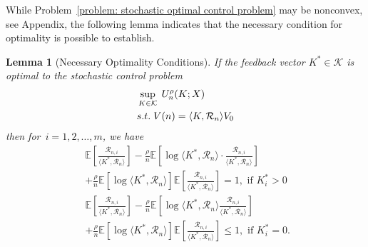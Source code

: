 \documentclass[letterpaper, 10 pt, journal, twoside]{IEEEtran}  %
\newtheorem{lemma}[theorem]{Lemma}
\begin{document}
 


While Problem~\eqref{problem: stochastic optimal control problem} may be nonconvex, see Appendix, the following lemma indicates that the necessary condition for optimality is possible to establish.



 
\begin{lemma}[Necessary Optimality Conditions] \label{Lemma: risk term}
    If the feedback vector $K^* \in \mathcal{K}$ is optimal to the stochastic control problem
\begin{align} 
    \begin{aligned} \label{problem: risk-sensitive problem}
        &\sup_{K \in \mathcal{K}}\; U_n^\rho (K; X)\\
        &{\rm s.t. } \; V(n) = \langle K, \mathcal{R}_n \rangle V_0 
    \end{aligned}
\end{align}
    then for~$i=1,2,\ldots,m$, we have
    \begin{align*}
        & \mathbb{E}\left[ \frac{ \mathcal{R}_{n,i} }{ \langle K^{*}, \mathcal{R}_n \rangle } \right] 
        - \frac{\rho}{n} \mathbb{E}\left[ \log \langle K^{*}, \mathcal{R}_n \rangle \cdot \frac{\mathcal{R}_{n,i}}{ \langle K^{*}, \mathcal{R}_n \rangle } \right] \\
        & +\frac{\rho}{n} \mathbb{E} \left[ \log \langle K^{*}, \mathcal{R}_n \rangle \right] \mathbb{E}\left[ \frac{\mathcal{R}_{n,i}}{\langle K^{*}, \mathcal{R}_n \rangle } \right] = 1, \text{ if $K_i^* > 0$ }
    \end{align*}
    \begin{align*}
         & \mathbb{E}\left[ \frac{\mathcal{R}_{n,i}}{\langle K^{*}, \mathcal{R}_n \rangle } \right] - \frac{\rho}{n}\mathbb{E}\left[ \log \langle K^{*}, \mathcal{R}_n \rangle \frac{\mathcal{R}_{n,i}}{\langle K^{*}, \mathcal{R}_n\rangle} \right] \\
        & +\frac{\rho}{n}\mathbb{E}\left[ \log \langle K^{*}, \mathcal{R}_n \rangle \right] \mathbb{E}\left[ \frac{\mathcal{R}_{n,i}}{ \langle K^{*}, \mathcal{R}_n \rangle } \right] \leq 1, \text{ if $K_i^* = 0$. }
    \end{align*}
\end{lemma}
\end{document}
